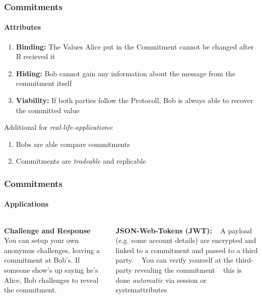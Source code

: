 \begin{frame}
	\frametitle{Commitments}
	\framesubtitle{Attributes}
	\begin{enumerate}
		\item \textbf{Binding:} The Values Alice put in the Commitment cannot be changed after B recieved it 
		\item \textbf{Hiding:} Bob cannot gain any information about the message from the commitment itself
		\item \textbf{Viability:} If both parties follow the Protocoll, Bob is always able to recover the committed value
	\end{enumerate}
	Additional for \textit{real-life-applications}:
	\begin{enumerate}
		\item Bobs are able compare commitments
		\item Commitments are \textit{tradeable} and replicable
	\end{enumerate}
\end{frame}

\begin{frame}
	\frametitle{Commitments}
	\framesubtitle{Applications}
	\begin{columns}
		\begin{column}{0.5\textwidth}
			\textbf{Challenge and Response} ~\newline
			You can setup your own anonymus challenges, leaving a commitment at Bob's. If someone show's up saying he's Alice, Bob challenges to reveal the commitment.
		\end{column}
		\begin{column}{0.5\textwidth}
			\textbf{JSON-Web-Tokens (JWT):} ~\newline
			A payload (e.g. some account details) are encrypted and linked to a commitment and passed to a third party. ~\newline 
			You can verify yourself at the third-party revealing the commitment ~\newline 
			this is done \textit{automatic} via session or systemattributes 
		\end{column}
	\end{columns}
\end{frame}